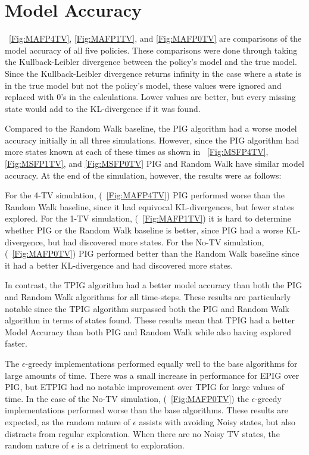 \documentclass[12pt]{thesis}
\begin{document}
\section{Model Accuracy}
\figurename~\ref{Fig:MAFP4TV}, \ref{Fig:MAFP1TV}, and \ref{Fig:MAFP0TV} are comparisons of the model accuracy of all five policies. These comparisons were done through taking the Kullback-Leibler divergence between the policy's model and the true model. Since the Kullback-Leibler divergence returns infinity in the case where a state is in the true model but not the policy's model, these values were ignored and replaced with 0's in the calculations. Lower values are better, but every missing state would add to the KL-divergence if it was found.

Compared to the Random Walk baseline, the PIG algorithm had a worse model accuracy initially in all three simulations. However, since the PIG algorithm had more states known at each of these times as shown in \figurename~\ref{Fig:MSFP4TV}, \ref{Fig:MSFP1TV}, and \ref{Fig:MSFP0TV} PIG and Random Walk have similar model accuracy. At the end of the simulation, however, the results were as follows:

For the 4-TV simulation, (\figurename~\ref{Fig:MAFP4TV}) PIG performed worse than the Random Walk baseline, since it had equivocal KL-divergences, but fewer states explored. For the 1-TV simulation, (\figurename~\ref{Fig:MAFP1TV}) it is hard to determine whether PIG or the Random Walk baseline is better, since PIG had a worse KL-divergence, but had discovered more states. For the No-TV simulation, (\figurename~\ref{Fig:MAFP0TV}) PIG performed better than the Random Walk baseline since it had a better KL-divergence and had discovered more states.

In contrast, the TPIG algorithm had a better model accuracy than both the PIG and Random Walk algorithms for all time-steps. These results are particularly notable since the TPIG algorithm surpassed both the PIG and Random Walk algorithm in terms of states found. These results mean that TPIG had a better Model Accuracy than both PIG and Random Walk while also having explored faster.

The $\epsilon$-greedy implementations performed equally well to the base algorithms for large amounts of time. There was a small increase in performance for EPIG over PIG, but ETPIG had no notable improvement over TPIG for large values of time. In the case of the No-TV simulation, (\figurename~\ref{Fig:MAFP0TV}) the $\epsilon$-greedy implementations performed worse than the base algorithms. These results are expected, as the random nature of $\epsilon$ assists with avoiding Noisy states, but also distracts from regular exploration. When there are no Noisy TV states, the random nature of $\epsilon$ is a detriment to exploration.
\end{document}
